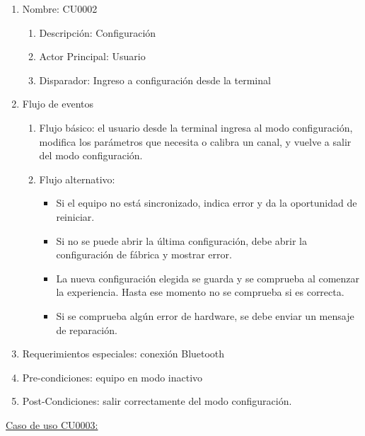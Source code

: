 	\begin{enumerate} 
		\item Nombre: CU0002
		\begin{enumerate} [label*=\arabic*.]
			\item Descripción: Configuración
			\item Actor Principal: Usuario
			\item Disparador: Ingreso a configuración desde la terminal
		\end{enumerate}
		\item Flujo de eventos
		\begin{enumerate} [label*=\arabic*.]
			\item Flujo básico: el usuario desde la terminal ingresa al modo configuración, modifica los parámetros que necesita o calibra un canal, y vuelve a salir del modo configuración.
			\item Flujo alternativo:
			\begin{itemize}
				\item Si el equipo no está sincronizado, indica error y da la oportunidad de reiniciar. 
				\item Si no se puede abrir la última configuración, debe abrir la configuración de fábrica y mostrar error.
				\item La nueva configuración elegida se guarda y se comprueba al comenzar la experiencia. Hasta ese momento no se comprueba si es correcta.
				\item Si se comprueba algún error de hardware, se debe enviar un mensaje de reparación.						
			\end{itemize}				
		\end{enumerate}

		\item Requerimientos especiales: conexión Bluetooth
		\item Pre-condiciones: equipo en modo inactivo
		\item Post-Condiciones: salir correctamente del modo configuración.
	\end{enumerate}



	\underline{Caso de uso CU0003:}

